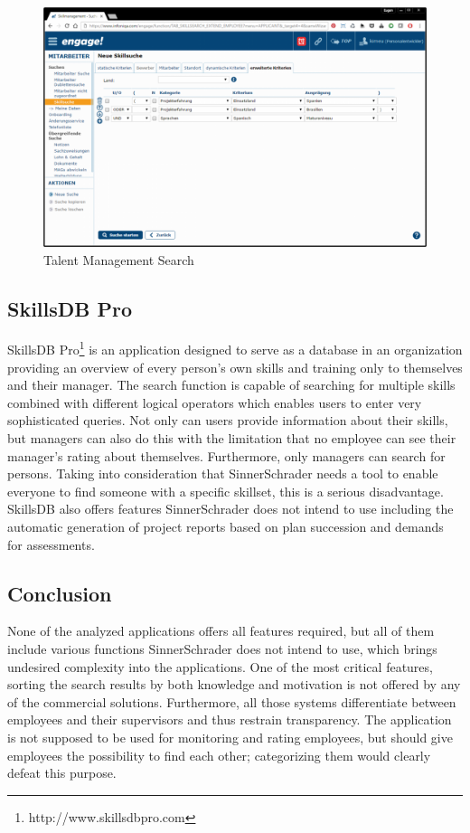 \begin{figure}[!htp]
    \centering
    \includegraphics[width=\textwidth]{images/talent_management_-_skillmanagement_-_skillsuche.png}
    \caption[Screenshot: Talent Management Search]{Talent Management Search}
    \label{fig:talent_management}
\end{figure}

\subsection{SkillsDB Pro}
SkillsDB Pro\footnote{http://www.skillsdbpro.com} is an application designed to serve as a database in an organization providing an overview of every person’s own skills and training only to themselves and their manager. The search function is capable of searching for multiple skills combined with different logical operators which enables users to enter very sophisticated queries.
Not only can users provide information about their skills, but managers can also do this with the limitation that no employee can see their manager’s rating about themselves.
Furthermore, only managers can search for persons. Taking into consideration that SinnerSchrader needs a tool to enable everyone to find someone with a specific skillset, this is a serious disadvantage.
SkillsDB also offers features SinnerSchrader does not intend to use including the automatic generation of project reports based on plan succession and demands for assessments.

\newpage

\subsection{Conclusion}
None of the analyzed applications offers all features required, but all of them include various functions SinnerSchrader does not intend to use, which brings undesired complexity into the applications.
One of the most critical features, sorting the search results by both knowledge and motivation is not offered by any of the commercial solutions.
Furthermore, all those systems differentiate between employees and their supervisors and thus restrain transparency. The application is not supposed to be used for monitoring and rating employees, but should give employees the possibility to find each other; categorizing them would clearly defeat this purpose.

